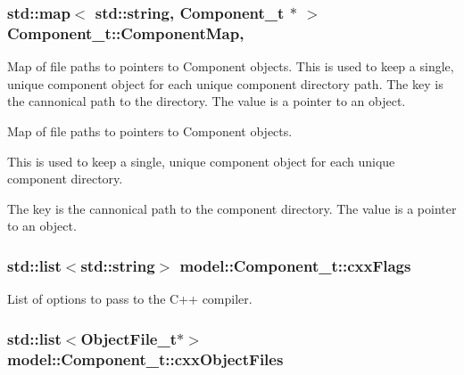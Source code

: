 \subsubsection[{\texorpdfstring{Component\+Map}{ComponentMap}}]{\setlength{\rightskip}{0pt plus 5cm}std\+::map$<$ std\+::string, {\bf Component\+\_\+t} $\ast$ $>$ Component\+\_\+t\+::\+Component\+Map\hspace{0.3cm}{\ttfamily [static]}, {\ttfamily [protected]}}\hypertarget{structmodel_1_1_component__t_a106ffd531432f8690fd7577665fab9cd}{}\label{structmodel_1_1_component__t_a106ffd531432f8690fd7577665fab9cd}
Map of file paths to pointers to Component objects. This is used to keep a single, unique component object for each unique component directory path. The key is the cannonical path to the directory. The value is a pointer to an object.

Map of file paths to pointers to Component objects.

This is used to keep a single, unique component object for each unique component directory.

The key is the cannonical path to the component directory. The value is a pointer to an object. 
\subsubsection[{\texorpdfstring{cxx\+Flags}{cxxFlags}}]{\setlength{\rightskip}{0pt plus 5cm}std\+::list$<$std\+::string$>$ model\+::\+Component\+\_\+t\+::cxx\+Flags}\hypertarget{structmodel_1_1_component__t_a9f652c0f3ce9c96529d6949e82ee8641}{}\label{structmodel_1_1_component__t_a9f652c0f3ce9c96529d6949e82ee8641}


List of options to pass to the C++ compiler. 

\subsubsection[{\texorpdfstring{cxx\+Object\+Files}{cxxObjectFiles}}]{\setlength{\rightskip}{0pt plus 5cm}std\+::list$<${\bf Object\+File\+\_\+t}$\ast$$>$ model\+::\+Component\+\_\+t\+::cxx\+Object\+Files}\hypertarget{structmodel_1_1_component__t_a40972dcd1d504cd9ad8b242b078808f7}{}\label{structmodel_1_1_component__t_a40972dcd1d504cd9ad8b242b078808f7}


